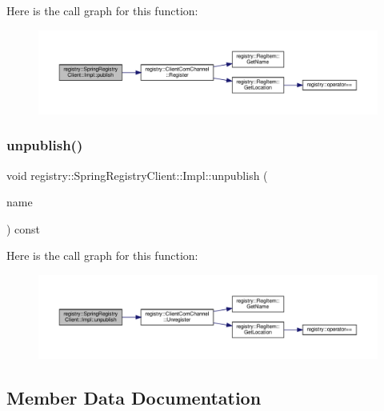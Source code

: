 Here is the call graph for this function\+:
\nopagebreak
\begin{figure}[H]
\begin{center}
\leavevmode
\includegraphics[width=350pt]{classregistry_1_1SpringRegistryClient_1_1Impl_a1b7694f4de9c0f95fe4ff76c54618057_cgraph}
\end{center}
\end{figure}
\mbox{\label{classregistry_1_1SpringRegistryClient_1_1Impl_ac3b721317dfb893e191d3d112575a627}} 
\subsubsection{\texorpdfstring{unpublish()}{unpublish()}}
{\footnotesize\ttfamily void registry\+::\+Spring\+Registry\+Client\+::\+Impl\+::unpublish (\begin{DoxyParamCaption}\item[{\hyperlink{structregistry_1_1BufferLocation}{Buffer\+Location} const \&}]{name }\end{DoxyParamCaption}) const}

Here is the call graph for this function\+:
\nopagebreak
\begin{figure}[H]
\begin{center}
\leavevmode
\includegraphics[width=350pt]{classregistry_1_1SpringRegistryClient_1_1Impl_ac3b721317dfb893e191d3d112575a627_cgraph}
\end{center}
\end{figure}


\subsection{Member Data Documentation}
\mbox{\label{classregistry_1_1SpringRegistryClient_1_1Impl_ab0b715b0d49462786aa052d732f8207c}} 
